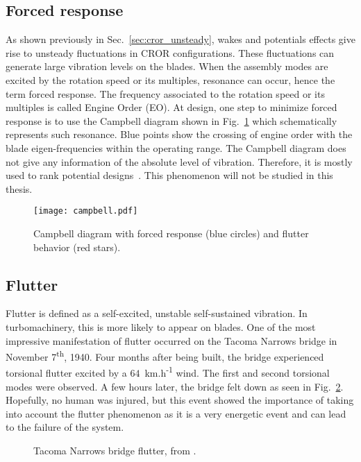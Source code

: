 
\subsection{Forced response}
\label{sub:forced_response}

As shown previously in Sec.~\ref{sec:cror_unsteady}, wakes and
potentials effects give rise to unsteady fluctuations in 
CROR configurations. These fluctuations 
can generate large vibration levels on the blades.
When the assembly modes are excited by the rotation speed
or its multiples, resonance can occur,
hence the term forced response. 
The frequency associated to the rotation speed or its multiples
is called Engine Order (EO).
At design, one step to minimize forced response is
to use the Campbell diagram shown in Fig.~\ref{fig:campbell}
which schematically represents such resonance.
Blue points show the crossing of engine order with 
the blade eigen-frequencies within the operating range. 
The Campbell diagram does not give any information of
the absolute level of vibration. Therefore, it is mostly
used to rank potential designs~\cite{Marshall1996}. This phenomenon
will not be studied in this thesis.
\begin{figure}[htp]
  \centering
  \texttt{[image: campbell.pdf]}
  \caption{Campbell diagram with forced response (blue circles)
  and flutter behavior (red stars).}
  \label{fig:campbell}
\end{figure}


\subsection{Flutter}
\label{sub:flutter}

Flutter is defined as a self-excited, unstable 
self-sustained vibration. In turbomachinery, this is
more likely to appear on blades.
One of the most impressive
manifestation of flutter occurred on the Tacoma Narrows
bridge in November 7\textsuperscript{th}, 1940.
Four months after being built, the bridge experienced 
torsional flutter excited by a 
\mbox{$64$~km.h\textsuperscript{-1}} wind.
The first and second torsional modes were observed.
A few hours later, the bridge felt down as seen in 
Fig.~\ref{fig:tacoma_bridge}. Hopefully, no human
was injured, but this event showed the importance
of taking into account the flutter phenomenon as
it is a very energetic event and can lead to the failure of the system.
\begin{figure}[htp]
  \centering
  \caption{Tacoma Narrows bridge flutter, from \citet{Smith1974}.}
  \label{fig:tacoma_bridge}
\end{figure}

